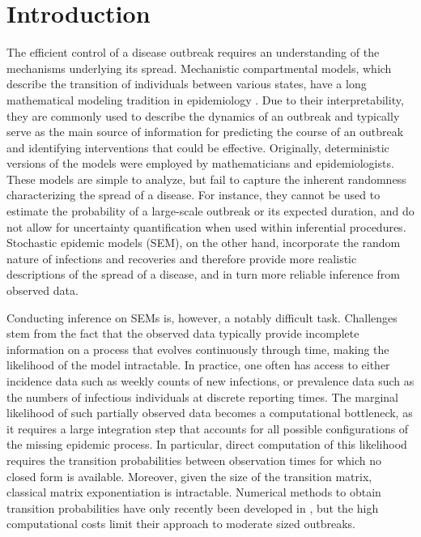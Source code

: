 \documentclass[11pt]{article}
\newcommand{\jx}[1]{{\color{blue}{ #1}}}
\begin{document}
	\section{Introduction}
	
	The efficient control of a disease outbreak requires an understanding of the mechanisms underlying its spread. Mechanistic compartmental models, which describe the transition of individuals between various states, have a long mathematical modeling tradition in epidemiology \cite{Kermack.1927}. Due to their interpretability, they are commonly used to describe the dynamics of an outbreak and typically serve as the main source of information for predicting the course of an outbreak and identifying interventions that could be effective. Originally, deterministic versions of the models were employed by mathematicians and epidemiologists. These models are simple to analyze, but fail to capture the inherent randomness characterizing the spread of a disease. For instance, they cannot be used to estimate the probability of a large-scale outbreak or its expected duration, and do not allow for uncertainty quantification when used within inferential procedures. Stochastic epidemic models (SEM), on the other hand, incorporate the random nature of infections and recoveries and therefore provide more realistic descriptions of the spread of a disease, and in turn more reliable inference from observed data.
	
	Conducting inference on SEMs is, however, a notably difficult task. Challenges stem from the fact that the observed data typically provide incomplete information on a process that evolves continuously through time, making the likelihood of the model intractable. %
	In practice, one often has access to either incidence data such as weekly counts of new infections, or prevalence data such as the numbers of infectious individuals at discrete reporting times. The marginal likelihood of such partially observed data becomes a computational bottleneck, as it requires a large integration step that accounts for all possible configurations of the missing epidemic process. In particular, direct computation of this likelihood requires the transition probabilities between observation times for which no closed form is available. Moreover, given the size of the transition matrix, classical matrix exponentiation is intractable. %
	Numerical methods to obtain transition probabilities have only recently been developed in \cite{Ho.2018b, Ho.2018}, but the high computational costs limit their approach to moderate sized outbreaks.
	
\end{document}

